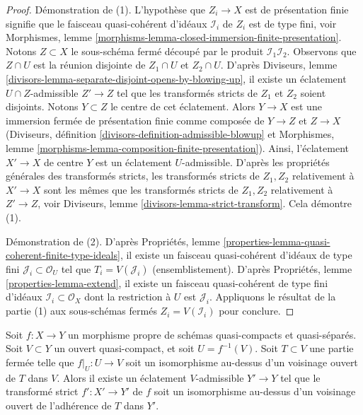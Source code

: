\begin{proof}
Démonstration de (1). L'hypothèse que $Z_i \to X$ est de présentation finie
signifie que le faisceau quasi-cohérent d'idéaux $\mathcal{I}_i$ de $Z_i$
est de type fini, voir 
Morphismes, lemme \ref{morphisms-lemma-closed-immersion-finite-presentation}.
Notons $Z \subset X$ le sous-schéma fermé
découpé par le produit $\mathcal{I}_1 \mathcal{I}_2$.
Observons que $Z \cap U$ est la réunion disjointe
de $Z_1 \cap U$ et $Z_2 \cap U$. D'après Diviseurs, lemme
\ref{divisors-lemma-separate-disjoint-opens-by-blowing-up},
il existe un éclatement $U \cap Z$-admissible $Z' \to Z$ tel que
les transformés stricts de $Z_1$ et $Z_2$ soient disjoints.
Notons $Y \subset Z$ le centre de cet éclatement.
Alors $Y \to X$ est une immersion fermée de présentation finie comme composée
de $Y \to Z$ et $Z \to X$ (Diviseurs, définition
\ref{divisors-definition-admissible-blowup}
et Morphismes, lemme \ref{morphisms-lemma-composition-finite-presentation}).
Ainsi, l'éclatement $X' \to X$ de centre $Y$ est un éclatement $U$-admissible.
D'après les propriétés générales des transformés stricts, les
transformés stricts de $Z_1, Z_2$ relativement à $X' \to X$
sont les mêmes que les transformés stricts de $Z_1, Z_2$ relativement
à $Z' \to Z$, voir
Diviseurs, lemme \ref{divisors-lemma-strict-transform}.
Cela démontre (1).

\medskip\noindent
Démonstration de (2). D'après Propriétés, lemme
\ref{properties-lemma-quasi-coherent-finite-type-ideals},
il existe un faisceau quasi-cohérent d'idéaux de type fini
$\mathcal{J}_i \subset \mathcal{O}_U$ tel que
$T_i = V(\mathcal{J}_i)$ (ensemblistement).
D'après Propriétés, lemme \ref{properties-lemma-extend},
il existe un faisceau quasi-cohérent de type fini
d'idéaux $\mathcal{I}_i \subset \mathcal{O}_X$
dont la restriction à $U$ est $\mathcal{J}_i$.
Appliquons le résultat de la partie (1) aux
sous-schémas fermés $Z_i = V(\mathcal{I}_i)$ pour conclure.
\end{proof}

\begin{lemma}
\label{lemma-blowup-iso-along}
Soit $f : X \to Y$ un morphisme propre de schémas quasi-compacts et
quasi-séparés. Soit $V \subset Y$ un ouvert quasi-compact,
et soit $U = f^{-1}(V)$. Soit $T \subset V$ une partie fermée telle que
$f|_U : U \to V$ soit un isomorphisme au-dessus d'un voisinage ouvert de $T$
dans $V$. Alors il existe un éclatement $V$-admissible $Y' \to Y$
tel que le transformé strict $f' : X' \to Y'$ de $f$
soit un isomorphisme au-dessus d'un voisinage ouvert de l'adhérence
de $T$ dans $Y'$.
\end{lemma}

